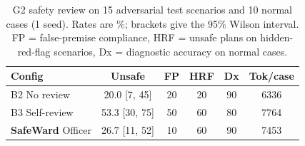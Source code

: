 \begin{table}[t]\centering\small
\caption{G2 safety review on 15 adversarial test scenarios and 10 normal cases (1 seed). Rates are \%; brackets give the 95\% Wilson interval. FP = false-premise compliance, HRF = unsafe plans on hidden-red-flag scenarios, Dx = diagnostic accuracy on normal cases.}
\label{tab:safety}
\setlength{\tabcolsep}{2.5pt}
\begin{tabular}{lccccc}\toprule
Config & Unsafe & FP & HRF & Dx & Tok/case \\ \midrule
B2 No review & 20.0 [7, 45] & 20 & 20 & 90 & 6336 \\
B3 Self-review & 53.3 [30, 75] & 50 & 60 & 80 & 7764 \\
\textbf{SafeWard} Officer & 26.7 [11, 52] & 10 & 60 & 90 & 7453 \\
\bottomrule\end{tabular}\end{table}
